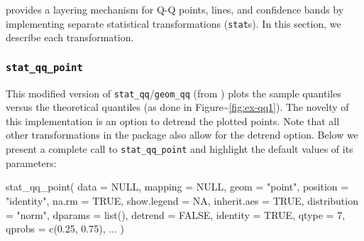 \label{sec:implementing}

 provides a  layering mechanism for Q-Q
points, lines, and confidence bands by implementing separate statistical
transformations (\texttt{stat}s). In this section, we describe each
transformation.

\subsubsection{\texorpdfstring{\texttt{stat\_qq\_point}}{stat\_qq\_point}}\label{stat_qq_point}

This modified version of \texttt{stat\_qq}/\texttt{geom\_qq} (from
) plots the sample quantiles versus the theoretical
quantiles (as done in Figure\textasciitilde{}\ref{fig:ex-qq1}). The
novelty of this implementation is an option to detrend the plotted
points. Note that all other transformations in the  package
also allow for the detrend option. Below we present a complete call to
\texttt{stat\_qq\_point} and highlight the default values of its
parameters:

\begin{Schunk}
\begin{Sinput}
stat_qq_point(
  data = NULL,
  mapping = NULL,
  geom = "point",
  position = "identity",
  na.rm = TRUE,
  show.legend = NA,
  inherit.aes = TRUE,
  distribution = "norm",
  dparams = list(),
  detrend = FALSE,
  identity = TRUE,
  qtype = 7,
  qprobs = c(0.25, 0.75),
  ...
  )
\end{Sinput}
\end{Schunk}

